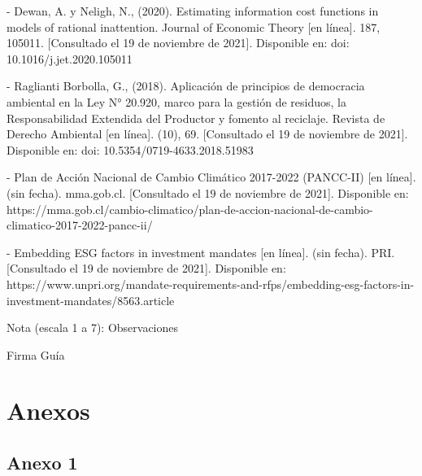 \documentclass[11pt,letterpaper]{article}
\begin{document}
\begin{enumerate}
- Dewan, A. y Neligh, N., (2020). Estimating information cost functions in models of rational inattention. Journal of Economic Theory [en línea]. 187, 105011. [Consultado el 19 de noviembre de 2021]. Disponible en: doi: 10.1016/j.jet.2020.105011

- Raglianti Borbolla, G., (2018). Aplicación de principios de democracia ambiental en la Ley N° 20.920, marco para la gestión de residuos, la Responsabilidad Extendida del Productor y fomento al reciclaje. Revista de Derecho Ambiental [en línea]. (10), 69. [Consultado el 19 de noviembre de 2021]. Disponible en: doi: 10.5354/0719-4633.2018.51983

- Plan de Acción Nacional de Cambio Climático 2017-2022 (PANCC-II) [en línea]. (sin fecha). mma.gob.cl. [Consultado el 19 de noviembre de 2021]. Disponible en: https://mma.gob.cl/cambio-climatico/plan-de-accion-nacional-de-cambio-climatico-2017-2022-pancc-ii/

- Embedding ESG factors in investment mandates [en línea]. (sin fecha). PRI. [Consultado el 19 de noviembre de 2021]. Disponible en: https://www.unpri.org/mandate-requirements-and-rfps/embedding-esg-factors-in-investment-mandates/8563.article

\newpage


Nota (escala 1 a 7): 
\vspace{3cm}
Observaciones



\centering Firma Guía



    
\end{enumerate}





\newpage

\section{Anexos}

\subsection{Anexo 1}











































\end{document}
